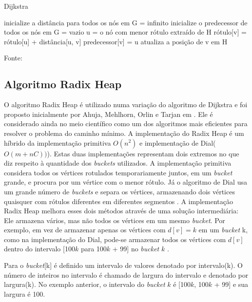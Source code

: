 \begin{algorithm}
\caption{Dijkstra}
\begin{algorithmic}[1]
\State inicialize a distância para todos os nós em G = infinito
\State inicialize o predecessor de todos os nós em G = vazio
  \State u = o nó com menor rótulo extraído de H
      \State rótulo[v] = rótulo[u] + distância[u, v]
      \State predecessor[v] = u
      \State atualiza a posição de v em H
    \EndIf
  \EndFor
\EndWhile
\end{algorithmic}
Fonte: \cite{cormen}
\label{newdijkstra}
\end{algorithm}
\FloatBarrier

\subsection{Algoritmo Radix Heap}
O algoritmo Radix Heap é utilizado numa variação do algoritmo de Dijkstra e foi proposto inicialmente por
Ahuja, Mehlhorn, Orlin e Tarjan em \cite{ahuja}.
Ele é considerado ainda no meio científico como um dos algoritmos mais eficientes para resolver o
problema do caminho mínimo.
A implementação do Radix Heap é um híbrido da implementação primitiva $O(n^2)$ e implementação de Dial($O(m + nC))$). 
Estas duas implementações representam dois extremos no que diz respeito à quantidade dos \textit{buckets} utilizados.
A implementação primitiva considera todos os vértices rotulados temporariamente juntos, em um \textit{bucket} grande,
e procura por um vértice com o menor rótulo. Já o algoritmo de Dial usa um grande número de \textit{buckets} e separa os vértices,
armazenando dois vértices quaisquer com rótulos diferentes em diferentes segmentos \cite{bookahuja}.
A implementação Radix Heap melhora esses dois métodos através de uma solução intermediária:
Ele armazena vários, mas não todos os vértices em um mesmo \textit{bucket}. Por exemplo, em vez de armazenar
apenas os vértices com $d[v] = k$ em um \textit{bucket} k, como na implementação do Dial,
pode-se armazenar todos os vértices com $d[v]$ dentro do intervalo [100$k$ para 100$k$ + 99] no \textit{bucket} $k$ \cite{bookahuja}.

Para o \textit{bucket}[k] é definido um intervalo de valores denotado por intervalo(k). O número de inteiros
no intervalo é chamado de largura do intervalo e denotado por largura(k).
No exemplo anterior, o intervalo do \textit{bucket} $k$ é [100$k$, 100$k$ + 99] e sua largura é 100. 

